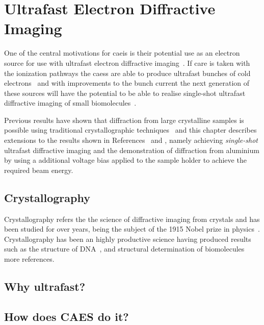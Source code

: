 \chapter{Ultrafast Electron Diffractive Imaging}\label{chapter:diffraction}

One of the central motivations for \gls{caeis} is their potential use as an electron source for use with ultrafast electron diffractive imaging~\cite{speirs_single-shot_2015,van_der_geer_ultracold_2009}.
If care is taken with the ionization pathways the \glspl{caes} are able to produce ultrafast bunches of cold electrons~\cite{speirs_single-shot_2015,speirs_identification_2017,speirs_electron_2017} and with improvements to the bunch current the next generation of these sources will have the potential to be able to realise single-shot ultrafast diffractive imaging of small biomolecules~\cite{mcculloch_cold_2016}.

Previous results have shown that diffraction from large crystalline samples is possible using traditional crystallographic techniques~\cite{speirs_single-shot_2015} and this chapter describes extensions to the results shown in References~\cite{speirs_single-shot_2015} and \cite{speirs_electron_2017}, namely achieving \emph{single-shot} ultrafast diffractive imaging and the demonstration of diffraction from aluminium by using a additional voltage bias applied to the sample holder to achieve the required beam energy.

\section{Crystallography}

Crystallography refers the the science of diffractive imaging from crystals and has been studied for over \unit[100]{years}, being the subject of the 1915 Nobel prize in physics~\cite{bragg_structure_1913}.
Crystallography has been an highly productive science having produced results such as the structure of DNA~\cite{franklin_structure_1953,dennis_eternal_2003}, and structural determination of biomolecules~\cite{longchamp_how_2015} {\color{red} more references}.


\section{Why ultrafast?}

\section{How does CAES do it?}

